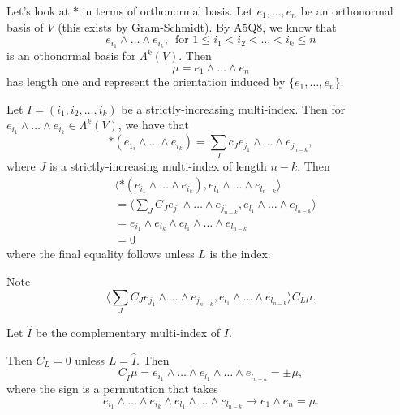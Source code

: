 \documentclass[notoc,notitlepage]{tufte-book}
\begin{document}
Let's look at $*$ in terms of orthonormal basis. Let $e_1, \ldots, e_n$ be an
orthonormal basis of $V$ (this exists by Gram-Schmidt). By A5Q8, we know that
\begin{equation*}
  e_{i_1} \land \hdots \land e_{i_k}, \, \text{ for } 1 \leq i_1 < i_2 < \hdots
  < i_k \leq n
\end{equation*}
is an othonormal basis for $\Lambda^k(V)$. Then
\begin{equation*}
  \mu = e_1 \land \hdots \land e_n
\end{equation*}
has length one and represent the orientation induced by $\{ e_1, \ldots, e_n\}$.

Let $I = (i_1, i_2, \ldots, i_k)$ be a strictly-increasing multi-index. Then for
$e_{i_1} \land \hdots \land e_{i_k} \in \Lambda^k(V)$, we have that
\begin{equation*}
  *(e_{1_i} \land \hdots \land e_{i_k}) = \sum_{J} c_J e_{j_1} \land \hdots
  \land e_{j_{n-k}},
\end{equation*}
where $J$ is a strictly-increasing multi-index of length $n - k$.
Then
\begin{align*}
  &\langle *(e_{i_1} \land \hdots \land e_{i_k}), e_{l_1} \land \hdots \land
  e_{l_{n-k}} \rangle  \\
  &= \langle \sum_{J} C_J e_{j_1} \land \hdots \land e_{j_{n-k}}, e_{l_1} \land
  \hdots \land e_{l_{n-k}} \rangle \\
  &= e_{i_1} \land e_{i_k} \land e_{l_1} \land \hdots \land e_{l_{n-k}} \\
  &= 0
\end{align*}
where the final equality follows unless $L$ is the 
index.

Note 
\begin{equation*}
  \langle \sum_{J} C_J e_{j_1} \land \hdots \land e_{j_{n-k}}, e_{l_1} \land
  \hdots \land e_{l_{n-k}} \rangle C_L \mu.
\end{equation*}

Let $\hat{I}$ be the complementary multi-index of $I$.

Then $C_L = 0$ unless $L = \hat{I}$. Then
\begin{equation*}
  C_{\hat{I}} \mu = e_{i_1} \land \hdots \land e_{l_1} \land \hdots \land
  e_{l_{n-k}} = \pm \mu,
\end{equation*}
where the sign is a permutation that takes
\begin{equation*}
  e_{i_1} \land \hdots \land e_{i_k} \land e_{l_1} \land \hdots \land
  e_{l_{n-k}} \to e_1 \land e_n = \mu.
\end{equation*}
\end{document}
